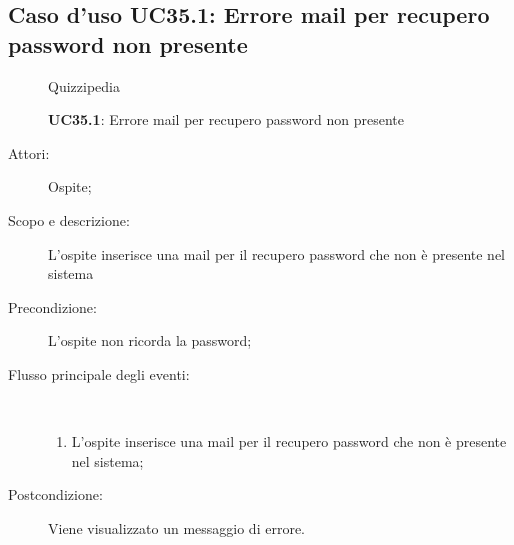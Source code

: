 \subsection{Caso d'uso UC35.1: Errore mail per recupero password non presente}
	\begin{figure}[H]
		\centering
		\begin{resizedtikzpicture}{\textwidth}
		\begin{umlsystem}[x=0, fill=lightgray!20]{Quizzipedia}
		\end{umlsystem}
		\end{resizedtikzpicture}
		\caption{\textbf{UC35.1}: Errore mail per recupero password non presente}
		\label{UC35.1}
	\end{figure}
\begin{description}
\item[Attori:] Ospite;
\item[Scopo e descrizione:] L'ospite inserisce una mail per il recupero password che non è presente nel sistema
      \item[Precondizione:] L'ospite non ricorda la password;

        \item[Flusso principale degli eventi:] \ 
 \begin{enumerate}
          \item L'ospite inserisce una mail per il recupero password che non è presente nel sistema;

      \end{enumerate}
    \item[Postcondizione:] Viene visualizzato un messaggio di errore.
  \end{description}
 
